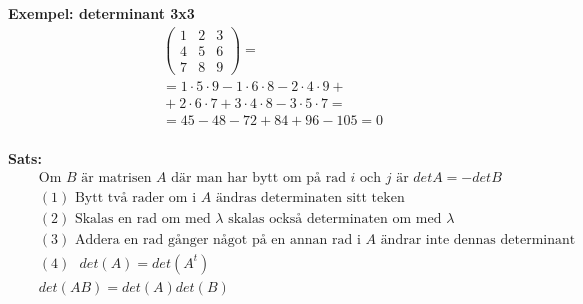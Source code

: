 \textbf{Exempel: determinant 3x3 }
\begin{align*}
  &\quad  
  \left(\begin{array}{ccc}
    1 & 2 & 3  \\
    4 & 5 & 6  \\
    7 & 8 & 9
  \end{array}\right) = \\
  &\quad  =1\cdot{5}\cdot{9}-1\cdot{6}\cdot{8}-2\cdot{4}\cdot{9}+ \\
  &\quad  +2\cdot{6}\cdot{7}+3\cdot{4}\cdot{8}-3\cdot{5}\cdot{7}= \\
  &\quad  =45-48-72+84+96-105=0 \\
\end{align*}

\textbf{Sats:}
\begin{align*}
  &\quad   \text{Om $B$ är matrisen $A$ där man har bytt om på rad $i$ och $j$ är } detA = -detB \\
  &\quad   (1) \text{ Bytt två rader om i $A$ ändras determinaten sitt teken} \\
  &\quad   (2) \text{ Skalas en rad om med $\lambda$ skalas också determinaten om med } \lambda \\
  &\quad   (3) \text{ Addera en rad gånger något på en annan rad i $A$ ändrar inte
    dennas determinant} \\
  &\quad   (4) \text{ } det(A) = det(A^t) \\
  &\quad   det(AB)=det(A)det(B) \\
\end{align*}



